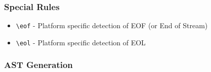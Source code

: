 \subsubsection{Special Rules}

\begin{itemize}
\item \texttt{\textbackslash{}eof} - Platform specific detection of EOF (or End of Stream)

\item \texttt{\textbackslash{}eol} - Platform specific detection of EOL

\end{itemize}

\subsubsection{AST Generation}

